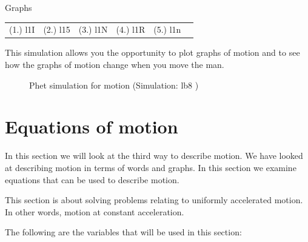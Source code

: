 \begin{exercises}{Graphs }
\par \practiceinfo
 \par \begin{tabular}[h]{cccccc}
 (1.) l1I  &  (2.) l15  &  (3.) l1N  &  (4.) l1R  &  (5.) l1n  & \end{tabular}
\end{exercises}
\label{m38795*eip-842}This simulation allows you the opportunity to plot graphs of motion and to see how the graphs of motion change when you move the man.
    \setcounter{subfigure}{0}
	\begin{figure}[H] %
    \textnormal{Phet simulation for motion}\nopagebreak
  \label{m38806*phet!!!underscore!!!sim}\label{m38806*phet-simulation}
             { (Simulation:  lb8 )}
 \end{figure}           \par 
  \label{m38795**end}
         \section{Equations of motion}
    \nopagebreak
      \label{m38796*id75595}In this section we will look at the third way to describe motion. We have looked at describing motion in terms of words and graphs. In this section we examine equations that can be used to describe motion.\par 
      \label{m38796*id75600}This section is about solving problems relating to uniformly accelerated motion. In other words, motion at constant acceleration.\par 
      \label{m38796*id75605}The following are the variables that will be used in this section:

